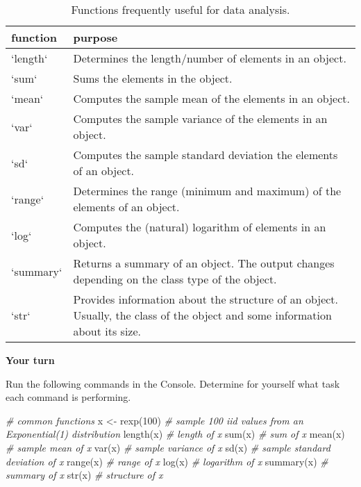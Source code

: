 \documentclass[
]{book}
\newenvironment{Shaded}{\begin{snugshade}}{\end{snugshade}}
\newcommand{\CommentTok}[1]{\textcolor[rgb]{0.56,0.35,0.01}{\textit{#1}}}
\newcommand{\DecValTok}[1]{\textcolor[rgb]{0.00,0.00,0.81}{#1}}
\newcommand{\FunctionTok}[1]{\textcolor[rgb]{0.00,0.00,0.00}{#1}}
\newcommand{\NormalTok}[1]{#1}
\newcommand{\OtherTok}[1]{\textcolor[rgb]{0.56,0.35,0.01}{#1}}
\theoremstyle{definition}
\theoremstyle{definition}
\theoremstyle{definition}
\theoremstyle{definition}
\theoremstyle{remark}
\begin{document}
\begin{table}

\caption{\label{tab:generalfunctions}Functions frequently useful for data analysis.}
\centering
\begin{tabular}[t]{l|l}
\hline
function & purpose\\
\hline
`length` & Determines the length/number of elements in an object.\\
\hline
`sum` & Sums the elements in the object.\\
\hline
`mean` & Computes the sample mean of the elements in an object.\\
\hline
`var` & Computes the sample variance of the elements in an object.\\
\hline
`sd` & Computes the sample standard deviation the elements of an object.\\
\hline
`range` & Determines the range (minimum and maximum) of the elements of an object.\\
\hline
`log` & Computes the (natural) logarithm of elements in an object.\\
\hline
`summary` & Returns a summary of an object. The output changes depending on the class type of the object.\\
\hline
`str` & Provides information about the structure of an object. Usually, the class of the object and some information about its size.\\
\hline
\end{tabular}
\end{table}

\begin{yourturn}

\textbf{Your turn}

Run the following commands in the Console. Determine for yourself what task each command is performing.

\begin{Shaded}
\begin{Highlighting}[]
\CommentTok{\# common functions}
\NormalTok{x }\OtherTok{\textless{}{-}} \FunctionTok{rexp}\NormalTok{(}\DecValTok{100}\NormalTok{) }\CommentTok{\# sample 100 iid values from an Exponential(1) distribution}
\FunctionTok{length}\NormalTok{(x) }\CommentTok{\# length of x}
\FunctionTok{sum}\NormalTok{(x) }\CommentTok{\# sum of x}
\FunctionTok{mean}\NormalTok{(x) }\CommentTok{\# sample mean of x}
\FunctionTok{var}\NormalTok{(x) }\CommentTok{\# sample variance of x}
\FunctionTok{sd}\NormalTok{(x) }\CommentTok{\# sample standard deviation of x}
\FunctionTok{range}\NormalTok{(x) }\CommentTok{\# range of x}
\FunctionTok{log}\NormalTok{(x) }\CommentTok{\# logarithm of x}
\FunctionTok{summary}\NormalTok{(x) }\CommentTok{\# summary of x}
\FunctionTok{str}\NormalTok{(x) }\CommentTok{\# structure of x}
\end{Highlighting}
\end{Shaded}

\end{yourturn}
\end{document}

